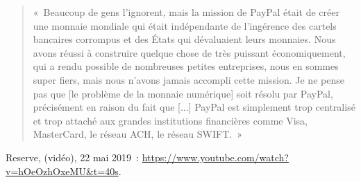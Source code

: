 {\begin{quote}
\footnotesize «~Beaucoup de gens l'ignorent, mais la mission de PayPal était de créer une monnaie mondiale qui était indépendante de l'ingérence des cartels bancaires corrompus et des États qui dévaluaient leurs monnaies. Nous avons réussi à construire quelque chose de très puissant économiquement, qui a rendu possible de nombreuses petites entreprises, nous en sommes super fiers, mais nous n'avons jamais accompli cette mission. Je ne pense pas que [le problème de la monnaie numérique] soit résolu par PayPal, précisément en raison du fait que [...] PayPal est simplement trop centralisé et trop attaché aux grandes institutions financières comme Visa, MasterCard, le réseau ACH, le réseau SWIFT.~»
\end{quote}
Reserve,  (vidéo), 22 mai 2019~: \url{https://www.youtube.com/watch?v=hOeOzhOxeMU\&t=40s}.} %

